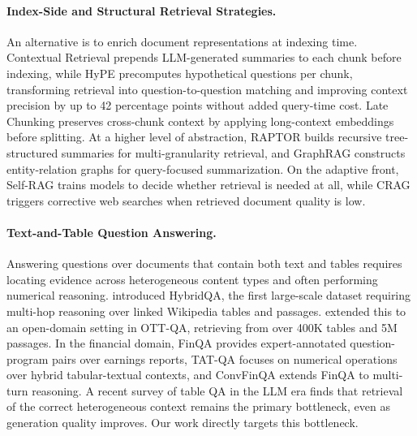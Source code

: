 \documentclass[11pt]{article}
\begin{document}
\paragraph{Index-Side and Structural Retrieval Strategies.}
An alternative is to enrich document representations at indexing time. Contextual Retrieval \citep{anthropic2024contextual} prepends LLM-generated summaries to each chunk before indexing, while HyPE \citep{vake2025hype} precomputes hypothetical questions per chunk, transforming retrieval into question-to-question matching and improving context precision by up to 42 percentage points without added query-time cost. Late Chunking \citep{guenther2024latechunking} preserves cross-chunk context by applying long-context embeddings before splitting. At a higher level of abstraction, RAPTOR \citep{sarthi2024raptor} builds recursive tree-structured summaries for multi-granularity retrieval, and GraphRAG \citep{edge2024graphrag} constructs entity-relation graphs for query-focused summarization. On the adaptive front, Self-RAG \citep{asai2023selfrag} trains models to decide whether retrieval is needed at all, while CRAG \citep{yan2024crag} triggers corrective web searches when retrieved document quality is low.

\paragraph{Text-and-Table Question Answering.}
Answering questions over documents that contain both text and tables requires locating evidence across heterogeneous content types and often performing numerical reasoning. \citet{chen2020hybridqa} introduced HybridQA, the first large-scale dataset requiring multi-hop reasoning over linked Wikipedia tables and passages. \citet{chen2021ottqa} extended this to an open-domain setting in OTT-QA, retrieving from over 400K tables and 5M passages. In the financial domain, FinQA \citep{chen2021finqa} provides expert-annotated question-program pairs over earnings reports, TAT-QA \citep{zhu2021tatqa} focuses on numerical operations over hybrid tabular-textual contexts, and ConvFinQA \citep{chen2022convfinqa} extends FinQA to multi-turn reasoning. A recent survey of table QA in the LLM era \citep{nan2025tableqasurvey} finds that retrieval of the correct heterogeneous context remains the primary bottleneck, even as generation quality improves. Our work directly targets this bottleneck.
\end{document}
